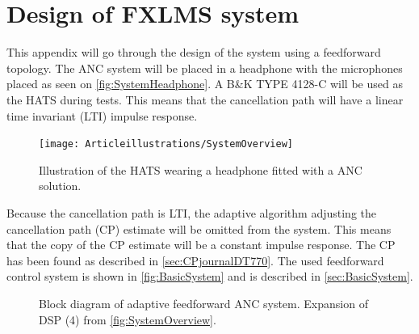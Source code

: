 \section{Design of FXLMS system} \label{sec:systemDesign}
This appendix will go through the design of the system using a feedforward topology. The ANC system will be placed in a headphone with the microphones placed as seen on \autoref{fig:SystemHeadphone}. A B\&K TYPE 4128-C will be used as the HATS during tests. This means that the cancellation path will have a linear time invariant (LTI) impulse response. 



\begin{figure}[H]
	\centering
	\texttt{[image: Articleillustrations/SystemOverview]}
	\caption{Illustration of the HATS wearing a headphone fitted with a ANC solution.}
	\label{fig:SystemHeadphone}
\end{figure}  

Because the cancellation path is LTI, the adaptive algorithm adjusting the cancellation path (CP) estimate will be omitted from the system. This means that the copy of the CP estimate will be a constant impulse response. The CP has been found as described in \autoref{sec:CPjournalDT770}. The used feedforward control system is shown in \autoref{fig:BasicSystem} and is described in \autoref{sec:BasicSystem}.


\begin{figure}[H]
	\centering
	
	\caption{Block diagram of adaptive feedforward ANC system. Expansion of DSP (4) from \autoref{fig:SystemOverview}.}
	\label{fig:ANCFeedforwardAppendix}
\end{figure}



